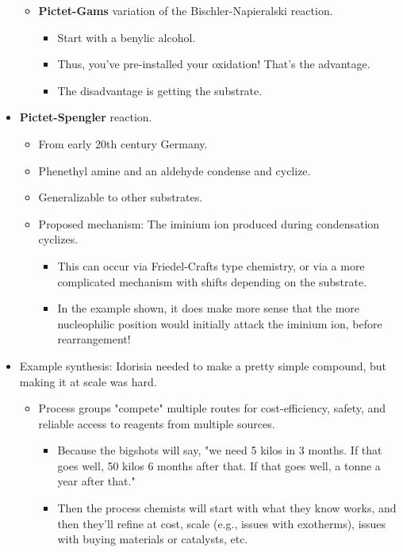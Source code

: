 \documentclass[../notes.tex]{subfiles}
\begin{document}
\begin{itemize}
\begin{itemize}
\begin{itemize}
        \end{itemize}
        \item \textbf{Pictet-Gams} variation of the Bischler-Napieralski reaction.
        \begin{itemize}
            \item Start with a benylic alcohol.
            \item Thus, you've pre-installed your oxidation! That's the advantage.
            \item The disadvantage is getting the substrate.
        \end{itemize}
    \end{itemize}
    \item \textbf{Pictet-Spengler} reaction.
    \begin{itemize}
        \item From early 20th century Germany.
        \item Phenethyl amine and an aldehyde condense and cyclize.
        \item Generalizable to other substrates.
        \item Proposed mechanism: The iminium ion produced during condensation cyclizes.
        \begin{itemize}
            \item This can occur via Friedel-Crafts type chemistry, or via a more complicated mechanism with shifts depending on the substrate.
            \item In the example shown, it does make more sense that the more nucleophilic position would initially attack the iminium ion, before rearrangement!
        \end{itemize}
    \end{itemize}
    \item Example synthesis: Idorisia needed to make a pretty simple compound, but making it at scale was hard.
    \begin{itemize}
        \item Process groups "compete" multiple routes for cost-efficiency, safety, and reliable access to reagents from multiple sources.
        \begin{itemize}
            \item Because the bigshots will say, "we need 5 kilos in 3 months. If that goes well, 50 kilos 6 months after that. If that goes well, a tonne a year after that."
            \item Then the process chemists will start with what they know works, and then they'll refine at cost, scale (e.g., issues with exotherms), issues with buying materials or catalysts, etc.

\end{itemize}
\end{itemize}
\end{itemize}
\end{document}
